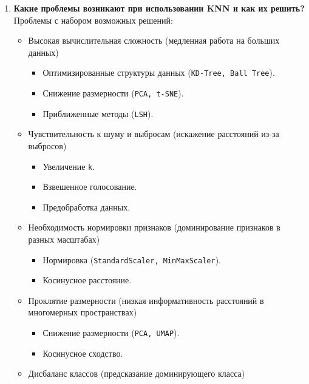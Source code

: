 \documentclass{article}
\begin{document}
\begin{enumerate}
\begin{itemize}
        \end{itemize}
    \item \textbf{Какие проблемы возникают при использовании KNN и как их решить?}
        Проблемы с набором возможных решений:
        \begin{itemize}
            \item Высокая вычислительная сложность (медленная работа на больших данных)
                \begin{itemize}
                    \item Оптимизированные структуры данных (\texttt{KD-Tree, Ball Tree}).
                    \item Снижение размерности (\texttt{PCA, t-SNE}).
                    \item Приближенные методы (\texttt{LSH}).
                \end{itemize}
            \item Чувствительность к шуму и выбросам (искажение расстояний из-за выбросов)
                \begin{itemize}
                    \item Увеличение \texttt{k}.
                    \item Взвешенное голосование.
                    \item Предобработка данных.
                \end{itemize}
            \item Необходимость нормировки признаков (доминирование признаков в разных масштабах)
                \begin{itemize}
                    \item Нормировка (\texttt{StandardScaler, MinMaxScaler}).
                    \item Косинусное расстояние.
                \end{itemize}
            \item Проклятие размерности (низкая информативность расстояний в многомерных пространствах)
                \begin{itemize}
                    \item Снижение размерности (\texttt{PCA, UMAP}).
                    \item Косинусное сходство.
                \end{itemize}
            \item Дисбаланс классов (предсказание доминирующего класса)
                \begin{itemize}

\end{itemize}
\end{itemize}
\end{enumerate}
\end{document}

